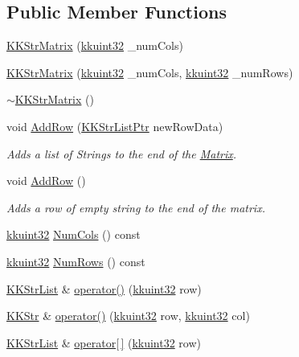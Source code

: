 \subsection*{Public Member Functions}
\begin{DoxyCompactItemize}
\item 
\hyperlink{class_k_k_b_1_1_k_k_str_matrix_ade0909216f9e78d764876c85afd74ad4}{K\+K\+Str\+Matrix} (\hyperlink{namespace_k_k_b_af8d832f05c54994a1cce25bd5743e19a}{kkuint32} \+\_\+num\+Cols)
\item 
\hyperlink{class_k_k_b_1_1_k_k_str_matrix_ae70cf3b2c37cac4c8b8d13df3050655c}{K\+K\+Str\+Matrix} (\hyperlink{namespace_k_k_b_af8d832f05c54994a1cce25bd5743e19a}{kkuint32} \+\_\+num\+Cols, \hyperlink{namespace_k_k_b_af8d832f05c54994a1cce25bd5743e19a}{kkuint32} \+\_\+num\+Rows)
\item 
\hyperlink{class_k_k_b_1_1_k_k_str_matrix_a8dc839eefbb961c8959cef70533851d2}{$\sim$\+K\+K\+Str\+Matrix} ()
\item 
void \hyperlink{class_k_k_b_1_1_k_k_str_matrix_a16193cec3a8f6825f35963e162eec3ca}{Add\+Row} (\hyperlink{namespace_k_k_b_a8f5f50672f37857425120831223888aa}{K\+K\+Str\+List\+Ptr} new\+Row\+Data)
\begin{DoxyCompactList}\small\item\em Adds a list of Strings to the end of the \hyperlink{class_k_k_b_1_1_matrix}{Matrix}. \end{DoxyCompactList}\item 
void \hyperlink{class_k_k_b_1_1_k_k_str_matrix_a7931337594c7e72307ff66380dbf73d8}{Add\+Row} ()
\begin{DoxyCompactList}\small\item\em Adds a row of empty string to the end of the matrix. \end{DoxyCompactList}\item 
\hyperlink{namespace_k_k_b_af8d832f05c54994a1cce25bd5743e19a}{kkuint32} \hyperlink{class_k_k_b_1_1_k_k_str_matrix_af58eaeb83ac7a86f4b7005a8f0951d4b}{Num\+Cols} () const 
\item 
\hyperlink{namespace_k_k_b_af8d832f05c54994a1cce25bd5743e19a}{kkuint32} \hyperlink{class_k_k_b_1_1_k_k_str_matrix_af644478d79ce893d0f24146fc1d9f4c3}{Num\+Rows} () const 
\item 
\hyperlink{class_k_k_b_1_1_k_k_str_list}{K\+K\+Str\+List} \& \hyperlink{class_k_k_b_1_1_k_k_str_matrix_ac999a6ac6d08d4ed8a271e8c5d9e6bbf}{operator()} (\hyperlink{namespace_k_k_b_af8d832f05c54994a1cce25bd5743e19a}{kkuint32} row)
\item 
\hyperlink{class_k_k_b_1_1_k_k_str}{K\+K\+Str} \& \hyperlink{class_k_k_b_1_1_k_k_str_matrix_a2d02622e52b9987d3cc3f7fe3cbcc938}{operator()} (\hyperlink{namespace_k_k_b_af8d832f05c54994a1cce25bd5743e19a}{kkuint32} row, \hyperlink{namespace_k_k_b_af8d832f05c54994a1cce25bd5743e19a}{kkuint32} col)
\item 
\hyperlink{class_k_k_b_1_1_k_k_str_list}{K\+K\+Str\+List} \& \hyperlink{class_k_k_b_1_1_k_k_str_matrix_a57b66602d7120e5655cd60309589c6a0}{operator\mbox{[}$\,$\mbox{]}} (\hyperlink{namespace_k_k_b_af8d832f05c54994a1cce25bd5743e19a}{kkuint32} row)
\end{DoxyCompactItemize}


